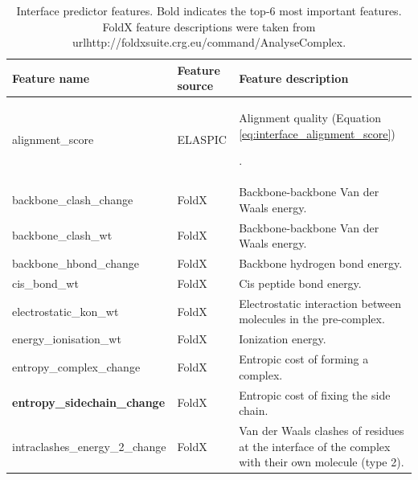 \begin{table}[!htb]
	\centering
	\caption[Interface predictor features.]{Interface predictor features. Bold indicates the top-6 most important features. FoldX feature descriptions were taken from url{http://foldxsuite.crg.eu/command/AnalyseComplex}.}
	\label{tab:interface_features}
	\begin{tabular}{ l | l | p{8cm} }
		\toprule
		Feature name                          & Feature source & Feature description                                                                                 \\
		\midrule
		alignment\_score                      & ELASPIC        & Alignment quality (Equation \ref{eq:interface_alignment_score})\par.                                \\
		backbone\_clash\_change               & FoldX          & Backbone-backbone Van der Waals energy.                                                             \\
		backbone\_clash\_wt                   & FoldX          & Backbone-backbone Van der Waals energy.                                                             \\
		backbone\_hbond\_change               & FoldX          & Backbone hydrogen bond energy.                                                                      \\
		cis\_bond\_wt                         & FoldX          & Cis peptide bond energy.                                                                            \\
		electrostatic\_kon\_wt                & FoldX          & Electrostatic interaction between molecules in the pre-complex.                                     \\
		energy\_ionisation\_wt                & FoldX          & Ionization energy.                                                                                  \\
		entropy\_complex\_change              & FoldX          & Entropic cost of forming a complex.                                                                 \\
		\textbf{entropy\_sidechain\_change}   & FoldX          & Entropic cost of fixing the side chain.                                                             \\
		intraclashes\_energy\_2\_change       & FoldX          & Van der Waals clashes of residues at the interface of the complex with their own molecule (type 2). \\

\end{tabular}
\end{table}
